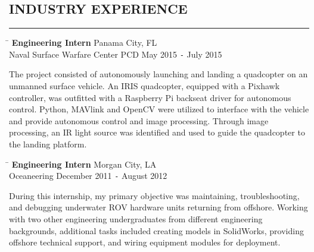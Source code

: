 \documentclass{res}
\begin{document}
\begin{resume}
\section{INDUSTRY EXPERIENCE}
	\vspace{0.005in}	
	\rule{\textwidth}{0.5pt}
	\vspace{-0.4in}
	\begin{tabbing}
		\hspace{4.652in}\= \kill %
		{\bf Engineering Intern} \> \hspace{0.3in}Panama City, FL  \\  
		 Naval Surface Warfare Center PCD \> May 2015 \texttt{-} July 2015	
	\end{tabbing}\vspace{-20pt}      %
	The project consisted of autonomously launching and landing a quadcopter on an unmanned surface vehicle. An IRIS quadcopter, equipped with a Pixhawk controller, was outfitted with a Raspberry Pi backseat driver for autonomous control. Python, MAVlink and OpenCV were utilized to interface with the vehicle and provide autonomous control and image processing. Through image processing, an IR light source was identified and used to guide the quadcopter to the landing platform.
		\vspace{-0.2in}
	\begin{tabbing}
		\hspace{4.155in}\=  \kill %
		{\bf Engineering Intern} \> \hspace{0.815in}Morgan City, LA \\
		Oceaneering \>December 2011 \texttt{-} August 2012
	\end{tabbing}\vspace{-20pt}
	During this internship, my primary objective was maintaining, troubleshooting, and debugging underwater ROV hardware units returning from offshore. Working with two other engineering undergraduates from different engineering backgrounds, additional tasks included creating models in SolidWorks, providing offshore technical support, and wiring equipment modules for deployment.


\end{resume}
\end{document}
